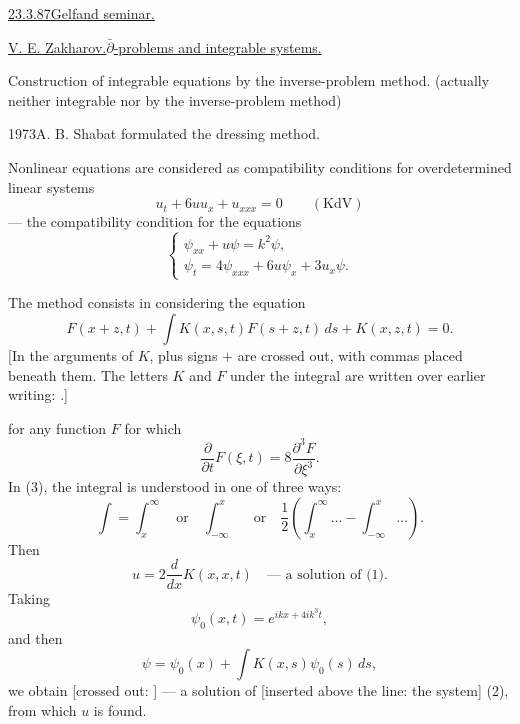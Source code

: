 \underline{23.3.87}\qquad \underline{Gelfand seminar.}

\underline{\underline{V. E. Zakharov.}}\qquad \underline{$\bar{\partial}$-problems and integrable systems.}

Construction of integrable equations by the inverse-problem method.
(actually neither integrable nor by the inverse-problem method)

1973\quad A. B. Shabat formulated the dressing method.

Nonlinear equations are considered as compatibility conditions for overdetermined linear systems
\begin{equation*}
u_t+6uu_x+u_{xxx}=0\qquad (\text{KdV}) \tag{1}
\end{equation*}
--- the compatibility condition for the equations
\begin{equation*}
\begin{cases}
\psi_{xx}+u\psi=k^2\psi,\\
\psi_t=4\psi_{xxx}+6u\psi_x+3u_x\psi.
\end{cases} \tag{2}
\end{equation*}

The method consists in considering the equation
\begin{equation*}
F(x+z,t)+\int K(x,s,t)F(s+z,t)\,ds+K(x,z,t)=0. \tag{3}
\end{equation*}
[In the arguments of $K$, plus signs $+$ are crossed out, with commas placed beneath them. The letters $K$ and $F$ under the integral are written over earlier writing:
.]

for any function $F$ for which
\begin{equation*}
\frac{\partial}{\partial t}F(\xi,t)=8\frac{\partial^3F}{\partial\xi^3}. \tag{4}
\end{equation*}
In (3), the integral is understood in one of three ways:
\begin{equation*}
\int=\int_x^\infty\quad\text{or}\quad\int_{-\infty}^x
\quad\text{or}\quad
\frac12\left(\int_x^\infty\ldots-\int_{-\infty}^x\ldots\right). \tag{5}
\end{equation*}
Then
\begin{equation*}
u=2\frac{d}{dx}K(x,x,t)\quad\text{--- a solution of (1)}. \tag{6}
\end{equation*}
Taking
\begin{equation*}
\psi_0(x,t)=e^{ikx+4ik^3t}, \tag{7}
\end{equation*}
and then
\begin{equation*}
\psi=\psi_0(x)+\int K(x,s)\psi_0(s)\,ds, \tag{8}
\end{equation*}
we obtain [crossed out: ]
--- a solution of [inserted above the line: the system] (2), from which $u$ is found.

